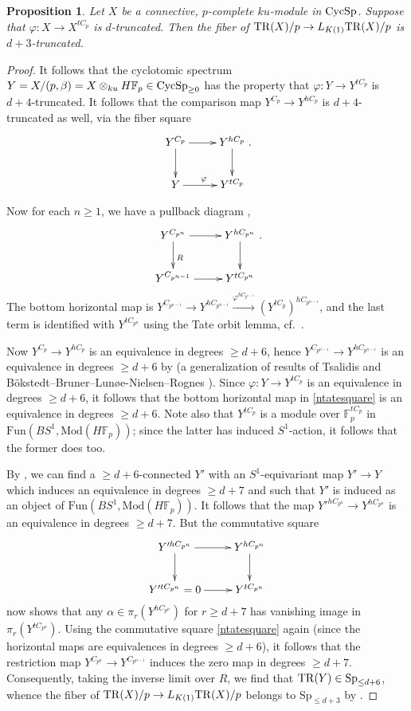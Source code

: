 \documentclass{amsart}
\renewcommand{\mod}{\mathrm{Mod}}
\renewcommand{\sp}{\mathrm{Sp}}
\newtheorem{proposition}[theorem]{Proposition}
\theoremstyle{definition}
\newcommand{\fun}{\mathrm{Fun}}
\begin{document}
\begin{proposition} 
Let $X$ be a connective, $p$-complete $ku$-module in $\mathrm{CycSp}$. 
Suppose that 
$\varphi\colon  X \to X^{tC_p}$ is $d$-truncated. 
Then the fiber of $\mathrm{TR}(X)/p \to L_{K(1)} \mathrm{TR}(X)/p$ is $ d + 3$-truncated. 
\label{K1locfromcycl}
\end{proposition} 
\begin{proof} 
It follows that the cyclotomic spectrum $Y = X/(p, \beta) = X \otimes_{ku} H
\mathbb{F}_p
\in \mathrm{CycSp}_{\geq 0}$ has the property that
$\varphi\colon  Y \to Y^{tC_p}$ is $d+4$-truncated. 
It follows that the comparison map $Y^{C_p} \to Y^{hC_p}$ is 
$d+4$-truncated as well, via the fiber square
\[ \xymatrix{
Y^{C_p} \ar[d]  \ar[r] & Y^{hC_p} \ar[d]  \\
Y \ar[r]^{\varphi} & Y^{tC_p}
}.\]

Now for each $n \geq 1$, 
we have a pullback diagram
\cite[Lem.~II.4.5]{NS18},
\begin{equation}  \label{ntatesquare} \xymatrix{
Y^{C_{p^n}} \ar[d]^R \ar[r] &  Y^{hC_{p^n}} \ar[d]  \\
Y^{C_{p^{n-1}}} \ar[r] &  Y^{tC_{p^n}}
}. \end{equation}
The bottom horizontal map is $Y^{C_{p^{n-1}}} \to Y^{hC_{p^{n-1}}}
\xrightarrow{\varphi^{hC_{p^{n-1}}}} (Y^{tC_p})^{hC_{p^{n-1}}}$, and the last
term is identified with $Y^{tC_{p^n}}$ using the Tate orbit lemma,
cf.~\cite[Lem.~II.4.1]{NS18}. 

Now $Y^{C_p} \to Y^{hC_p}$ is an equivalence in degrees $\geq d+ 6$, hence 
$Y^{C_{p^{n-1}}} \to Y^{hC_{p^{n-1}}}$ is an equivalence in degrees $\geq d+ 6$
by \cite[Cor.~II.4.9]{NS18} (a generalization of results of
Tsalidis \cite{Tsalidis} and
B\"okstedt--Bruner--Lun\o e-Nielsen--Rognes \cite{BBLR}). 
Since $\varphi \colon  Y \to Y^{tC_p}$ is an equivalence in degrees $\geq d+6$, it
follows that 
the bottom horizontal map in \eqref{ntatesquare} is an equivalence in degrees
$\geq d+ 6$. Note also that $Y^{tC_p}$ is a module over $\mathbb{F}_p^{tC_p}$ 
in $\fun(BS^1, \mod(H\mathbb{F}_p))$; since the latter has induced $S^1$-action,
it follows that the former does too. 

By , we can find a $\geq d+6$-connected $Y'$ with an $S^1$-equivariant map 
$Y' \to 
Y$ which induces an equivalence in degrees 
$\geq d + 7$ and such that $Y'$ is induced as an object of $\fun(BS^1, \mod(H
\mathbb{F}_p))$. 
It follows that the map $Y'^{hC_{p^n}} \to Y^{hC_{p^n}}$ is an equivalence in
degrees $\geq d + 7$. But the commutative square
\[ \xymatrix{
Y'^{hC_{p^n}} \ar[d]  \ar[r] &  Y^{hC_{p^n}} \ar[d]  \\
Y'^{tC_{p^n}} = 0 \ar[r] &  Y^{tC_{p^n}}
}\]
now shows that any $\alpha \in \pi_r( Y^{hC_{p^n}})$ for $r \geq d + 7$ has
vanishing image in $\pi_r (Y^{tC_{p^n}})$. 
Using the commutative square 
\eqref{ntatesquare} again (since the horizontal maps are equivalences in
degrees $\geq d+6$), it follows that the restriction map 
$Y^{C_{p^n}} \to Y^{C_{p^{n-1}}}$ induces the zero map in degrees $\geq d + 7$. 
Consequently, taking the inverse limit over $R$, we find that $\TR(Y) \in
\sp_{\leq d + 6}$, whence the fiber of $\mathrm{TR}(X)/p \to L_{K(1)} \mathrm{TR}(X)/p$ belongs to $\sp_{\leq d + 3}$
by . 
\end{proof} 
\end{document}
